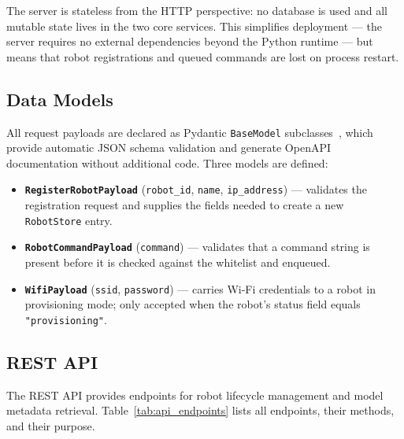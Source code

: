 The server is stateless from the HTTP perspective: no database is
used and all mutable state lives in the two core services. This
simplifies deployment — the server requires no external dependencies
beyond the Python runtime — but means that robot registrations and
queued commands are lost on process restart.

\subsection{Data Models}
\label{sec:server_models}

All request payloads are declared as Pydantic
\texttt{BaseModel} subclasses~\cite{pydantic2024}, which provide
automatic JSON schema validation and generate OpenAPI documentation
without additional code. Three models are defined:

\begin{itemize}
	\item \textbf{\texttt{RegisterRobotPayload}} (\texttt{robot\_id},
	\texttt{name}, \texttt{ip\_address}) — validates the
	registration request and supplies the fields needed to
	create a new \texttt{RobotStore} entry.
	
	\item \textbf{\texttt{RobotCommandPayload}} (\texttt{command})
	— validates that a command string is present before it is
	checked against the whitelist and enqueued.
	
	\item \textbf{\texttt{WifiPayload}} (\texttt{ssid},
	\texttt{password}) — carries Wi-Fi credentials to a robot
	in provisioning mode; only accepted when the robot's status
	field equals \texttt{"provisioning"}.
\end{itemize}

\subsection{REST API}
\label{sec:server_rest}

The REST API provides endpoints for robot lifecycle management and
model metadata retrieval. Table~\ref{tab:api_endpoints} lists all
endpoints, their methods, and their purpose.

